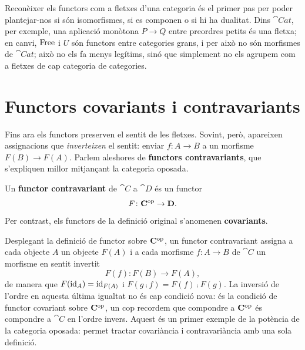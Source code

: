 \begin{observacio}
Reconèixer els functors com a fletxes d'una categoria és el primer pas per poder plantejar-nos si són isomorfismes, si es componen o si hi ha dualitat. Dins $\cat{Cat}$, per exemple, una aplicació monòtona $P\to Q$ entre preordres petits és una fletxa; en canvi, $\operatorname{Free}$ i $U$ són functors entre categories grans, i per això no són morfismes de $\cat{Cat}$; això no els fa menys legítims, sinó que simplement no els agrupem com a fletxes de cap categoria de categories.
\end{observacio}

\section{Functors covariants i contravariants}\label{sec:variancia}

Fins ara els functors preserven el sentit de les fletxes. Sovint, però, apareixen assignacions que \emph{inverteixen} el sentit: enviar $f\colon A\to B$ a un morfisme $F(B)\to F(A)$. Parlem aleshores de \textbf{functors contravariants}, que s'expliquen millor mitjançant la categoria oposada.

\begin{definicio}
Un \textbf{functor contravariant} de $\cat{C}$ a $\cat{D}$ és un functor
\[
F\colon\mathbf{C}^{\mathrm{op}}\to\mathbf{D}.
\]
Per contrast, els functors de la definició original s'anomenen \textbf{covariants}.
\end{definicio}

Desplegant la definició de functor sobre $\mathbf{C}^{\mathrm{op}}$, un functor contravariant assigna a cada objecte $A$ un objecte $F(A)$ i a cada morfisme $f\colon A\to B$ de $\cat{C}$ un morfisme en sentit invertit
\[
F(f)\colon F(B)\to F(A),
\]
de manera que $F(\operatorname{id}_A)=\operatorname{id}_{F(A)}$ i $F(g\comp f)=F(f)\comp F(g)$. La inversió de l'ordre en aquesta última igualtat no és cap condició nova: és la condició de functor covariant sobre $\mathbf{C}^{\mathrm{op}}$, un cop recordem que compondre a $\mathbf{C}^{\mathrm{op}}$ és compondre a $\cat{C}$ en l'ordre invers. Aquest és un primer exemple de la potència de la categoria oposada: permet tractar covariància i contravariància amb una sola definició.

